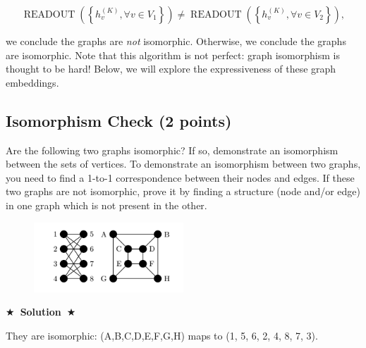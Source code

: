 \documentclass{article}
\numberwithin{figure}{section}
\newcommand{\Solution}[1]{{\medskip \color{red} \bf $\bigstar$~\sf \textbf{Solution}~$\bigstar$ \sf #1 } \bigskip}
\begin{document}
$$\operatorname { READOUT }\left(\left\{h_v^{(K)}, \forall v \in V_1\right\}\right) \neq \operatorname { READOUT }\left(\left\{h_v^{(K)}, \forall v \in V_2\right\}\right),$$

we conclude the graphs are \textit{not} isomorphic. Otherwise, we conclude the graphs are isomorphic. Note that this algorithm is not perfect: graph isomorphism is thought to be hard! Below, we will explore the expressiveness of these graph embeddings. 

\subsection{Isomorphism Check (2 points)}
Are the following two graphs isomorphic? If so, demonstrate an isomorphism
between the sets of vertices. To demonstrate an isomorphism between two
graphs, you need to find a 1-to-1 correspondence between their nodes and edges.
If these two graphs are not isomorphic, prove it by finding a structure (node
and/or edge) in one graph which is not present in the other. 
    \begin{figure}[H]
        \centering
        \includegraphics[width=0.5\textwidth]{CS224W_Homework1/fig1.png}
    \end{figure}

\Solution{
  
They are isomorphic: (A,B,C,D,E,F,G,H) maps to (1, 5, 6, 2, 4, 8, 7, 3).}
\end{document}
